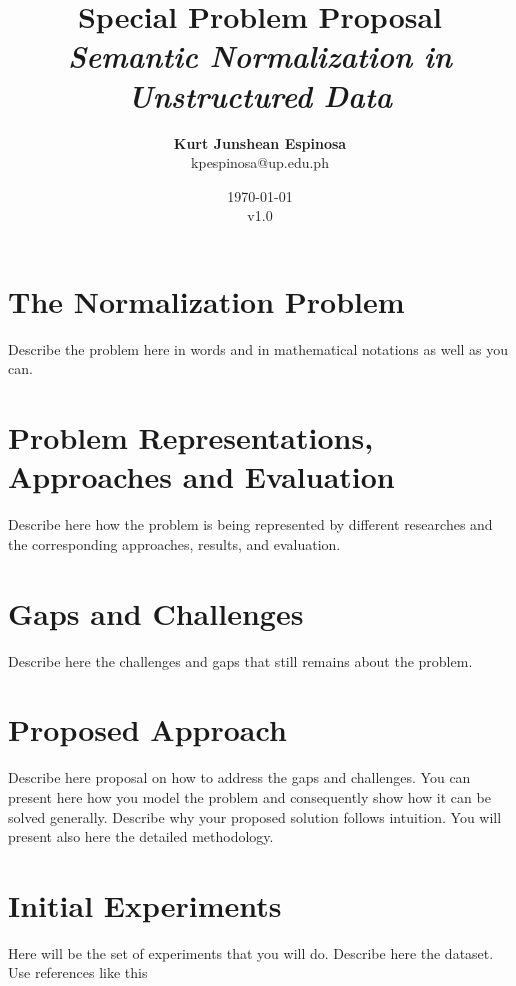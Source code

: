 \documentclass[12pt]{article}
\title{{\bf Special Problem Proposal} \\
\it Semantic Normalization in Unstructured Data}
\author{ {\bf Kurt Junshean Espinosa}  \\
{\small kpespinosa@up.edu.ph}
}
\date{\today\\v1.0}
\begin{document}
\pagestyle{plain}
\maketitle



\pagebreak
\tableofcontents
\pagebreak

\cleardoublepage
{}

\section{The Normalization Problem}
\label{ch:intro}
Describe the problem here in words and in mathematical notations as well as you can. 

\section{Problem Representations, Approaches and Evaluation}
\label{ch:proposal}
Describe here how the problem is being represented by different researches and the corresponding approaches, results, and evaluation.

\section{Gaps and Challenges}
\label{ch:proposal}
Describe here the challenges and gaps that still remains about the problem.

\section{Proposed Approach}
\label{ch:proposal}
Describe here proposal on how to address the gaps and challenges. You can present here how you model the problem and consequently show how it can be solved generally. Describe why your proposed solution follows intuition. You will present also here the detailed methodology.

\section{Initial Experiments}
Here will be the set of experiments that you will do. Describe here the dataset. Use references like this\cite{Etzioni200591}

 

\end{document}
